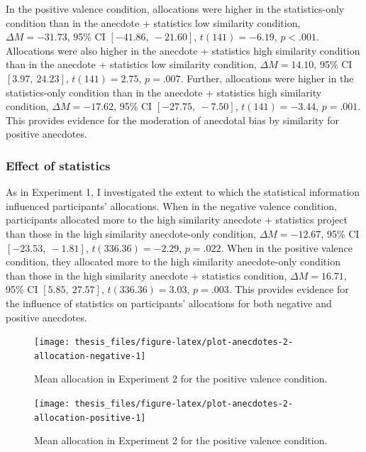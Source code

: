 \documentclass[a4paper, nobind, dvipsnames]{templates/ociamthesis}
\theoremstyle{definition}
\theoremstyle{definition}
\theoremstyle{definition}
\theoremstyle{definition}
\theoremstyle{remark}
\begin{document}
In the positive valence condition, allocations were higher in the statistics-only
condition than in the anecdote + statistics low similarity condition,
\(\Delta M = -31.73\), 95\% CI \([-41.86,~-21.60]\), \(t(141) = -6.19\), \(p < .001\).
Allocations were also higher in the anecdote + statistics high similarity condition than in
the anecdote + statistics low similarity condition,
\(\Delta M = 14.10\), 95\% CI \([3.97,~24.23]\), \(t(141) = 2.75\), \(p = .007\).
Further, allocations were higher in the statistics-only condition than in the
anecdote + statistics high similarity condition,
\(\Delta M = -17.62\), 95\% CI \([-27.75,~-7.50]\), \(t(141) = -3.44\), \(p = .001\).
This provides evidence for the moderation of anecdotal bias by similarity for
positive anecdotes.

\hypertarget{effect-of-statistics}{%
\subsubsection{Effect of statistics}\label{effect-of-statistics}}

As in Experiment 1, I investigated the extent to which the statistical
information influenced participants' allocations. When in the negative valence
condition, participants allocated more to the high similarity anecdote +
statistics project than those in the high similarity anecdote-only condition,
\(\Delta M = -12.67\), 95\% CI \([-23.53,~-1.81]\), \(t(336.36) = -2.29\), \(p = .022\).
When in the positive valence condition, they allocated more to the high similarity
anecdote-only condition than those in the high similarity anecdote + statistics condition,
\(\Delta M = 16.71\), 95\% CI \([5.85,~27.57]\), \(t(336.36) = 3.03\), \(p = .003\). This provides
evidence for the influence of statistics on participants' allocations for both
negative and positive anecdotes.



\begin{figure}
\texttt{[image: thesis\_files/figure-latex/plot-anecdotes-2-allocation-negative-1]} \caption{Mean allocation in Experiment 2 for the positive valence condition.}\label{fig:plot-anecdotes-2-allocation-negative}
\end{figure}



\begin{figure}
\texttt{[image: thesis\_files/figure-latex/plot-anecdotes-2-allocation-positive-1]} \caption{Mean allocation in Experiment 2 for the positive valence condition.}\label{fig:plot-anecdotes-2-allocation-positive}
\end{figure}
\end{document}
